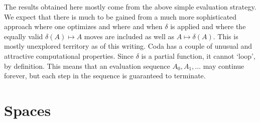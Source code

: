 \documentclass[11pt]{article}
\begin{document}
    The results obtained here mostly come from the above simple evaluation strategy.
We expect that there is much to be gained from a much more sophisticated approach 
where one optimizes and where and when $\delta$ is applied and where the equally valid $\delta(A)\mapsto A$ moves are included as well
as $A\mapsto\delta(A)$.  This is mostly unexplored territory as of this writing.  Coda has a couple of unusual and attractive computational properties.
Since $\delta$ is a partial function, it cannot `loop', by definition.  This means that an evaluation sequence $A_0,A_1,\dots$ may continue forever,
but each step in the sequence is guaranteed to terminate.  

\section{Spaces}
\end{document}
